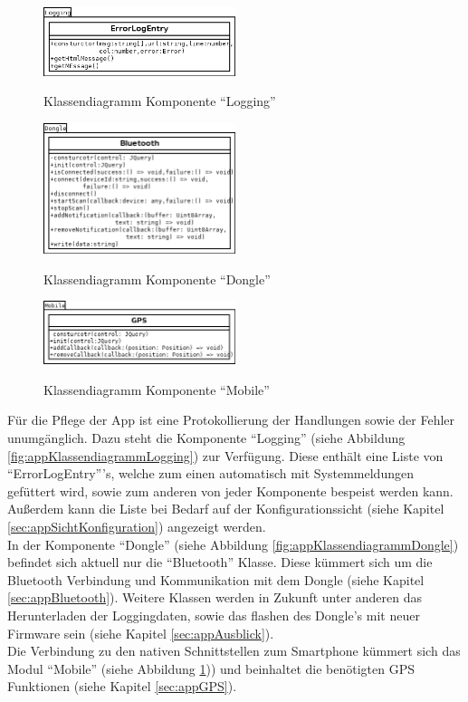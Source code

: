 \begin{figure}
  \begin{center}
    \includegraphics[width=0.5\textwidth]{./img/App_Klassendiagramm_Logging}
    \caption{Klassendiagramm Komponente \enquote{Logging}}
    \label{fig:appKlassendiagrammLogging}
    \includegraphics[width=0.5\textwidth]{./img/App_Klassendiagramm_Dongle}
    \caption{Klassendiagramm Komponente \enquote{Dongle}}
    \label{fig:appKlassendiagrammDongle}
    \includegraphics[width=0.5\textwidth]{./img/App_Klassendiagramm_Mobile}
    \caption{Klassendiagramm Komponente \enquote{Mobile}}
    \label{fig:appKlassendiagrammMobile}
  \end{center}
\end{figure}

Für die Pflege der App ist eine Protokollierung der Handlungen sowie der Fehler unumgänglich. Dazu steht die Komponente \enquote{Logging} (siehe Abbildung \ref{fig:appKlassendiagrammLogging}) zur Verfügung. Diese enthält eine Liste von \enquote{ErrorLogEntry}'s, welche zum einen automatisch mit Systemmeldungen gefüttert wird, sowie zum anderen von jeder Komponente bespeist werden kann. Außerdem kann die Liste bei Bedarf auf der Konfigurationssicht (siehe Kapitel \ref{sec:appSichtKonfiguration}) angezeigt werden.
\\
In der Komponente \enquote{Dongle} (siehe Abbildung \ref{fig:appKlassendiagrammDongle}) befindet sich aktuell nur die \enquote{Bluetooth} Klasse. Diese kümmert sich um die Bluetooth Verbindung und Kommunikation mit dem Dongle (siehe Kapitel \ref{sec:appBluetooth}).
Weitere Klassen werden in Zukunft unter anderen das Herunterladen der Loggingdaten, sowie das flashen des Dongle's mit neuer Firmware sein (siehe Kapitel \ref{sec:appAusblick}).
\\
Die Verbindung zu den nativen Schnittstellen zum Smartphone kümmert sich das Modul \enquote{Mobile} (siehe Abbildung \ref{fig:appKlassendiagrammMobile})) und beinhaltet die benötigten GPS Funktionen (siehe Kapitel \ref{sec:appGPS}).

